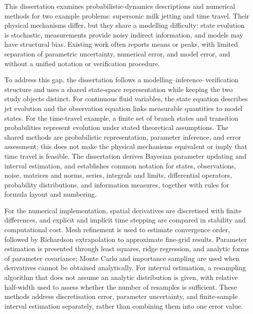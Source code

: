 \begin{englishabstract}

This dissertation examines probabilistic-dynamics descriptions and numerical methods for two example problems: supersonic milk jetting and time travel. Their physical mechanisms differ, but they share a modelling difficulty: state evolution is stochastic, measurements provide noisy indirect information, and models may have structural bias. Existing work often reports means or peaks, with limited separation of parametric uncertainty, numerical error, and model error, and without a unified notation or verification procedure.

To address this gap, the dissertation follows a modelling–inference–verification structure and uses a shared state-space representation while keeping the two study objects distinct. For continuous fluid variables, the state equation describes jet evolution and the observation equation links measurable quantities to model states. For the time-travel example, a finite set of branch states and transition probabilities represent evolution under stated theoretical assumptions. The shared methods are probabilistic representation, parameter inference, and error assessment; this does not make the physical mechanisms equivalent or imply that time travel is feasible. The dissertation derives Bayesian parameter updating and interval estimation, and establishes common notation for states, observations, noise, matrices and norms, series, integrals and limits, differential operators, probability distributions, and information measures, together with rules for formula layout and numbering.

For the numerical implementation, spatial derivatives are discretised with finite differences, and explicit and implicit time stepping are compared in stability and computational cost. Mesh refinement is used to estimate convergence order, followed by Richardson extrapolation to approximate fine-grid results. Parameter estimation is presented through least squares, ridge regression, and analytic forms of parameter covariance; Monte Carlo and importance sampling are used when derivatives cannot be obtained analytically. For interval estimation, a resampling algorithm that does not assume an analytic distribution is given, with relative half-width used to assess whether the number of resamples is sufficient. These methods address discretisation error, parameter uncertainty, and finite-sample interval estimation separately, rather than combining them into one error value.


\end{englishabstract}
